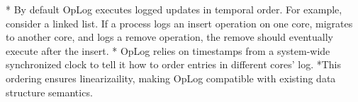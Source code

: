 \fi





\ifkor
\else
* By default OpLog executes logged updates in temporal order. For example,
consider a linked list. If a process logs an insert operation on one core,
migrates to another core, and logs a remove operation, the remove should
eventually execute after the insert.
* OpLog relies on timestamps from a system-wide synchronized clock to tell it
how to order entries in different cores' log.
*This ordering ensures linearizaility, making OpLog compatible with existing
data structure semantics.
\fi











